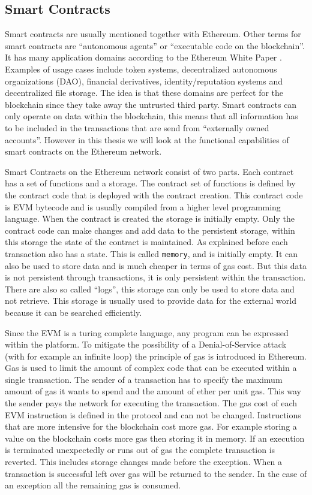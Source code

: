 \documentclass[a4paper]{article}
\begin{document}
\subsection{Smart Contracts}
Smart contracts are usually mentioned together with Ethereum. Other terms for smart contracts are ``autonomous agents'' or ``executable code on the blockchain''. It has many application domains according to the Ethereum White Paper \cite{buterin2013ethereum}. Examples of usage cases include token systems, decentralized autonomous organizations (DAO), financial derivatives, identity/reputation systems and decentralized file storage. The idea is that these domains are perfect for the blockchain since they take away the untrusted third party. Smart contracts can only operate on data within the blockchain, this means that all information has to be included in the transactions that are send from ``externally owned accounts''. However in this thesis we will look at the functional capabilities of smart contracts on the Ethereum network. \par 
Smart Contracts on the Ethereum network consist of two parts. Each contract has a set of functions and a storage. The contract set of functions is defined by the contract code that is deployed with the contract creation. This contract code is EVM bytecode and is usually compiled from a higher level programming language. When the contract is created the storage is initially empty. Only the contract code can make changes and add data to the persistent storage, within this storage the state of the contract is maintained. As explained before each transaction also has a state. This is called \texttt{memory}, and is initially empty. It can also be used to store data and is much cheaper in terms of gas cost. But this data is not persistent through transactions, it is only persistent within the transaction. There are also so called ``logs'', this storage can only be used to store data and not retrieve. This storage is usually used to provide data for the external world because it can be searched efficiently.\par
Since the EVM is a turing complete language, any program can be expressed within the platform. To mitigate the possibility of a Denial-of-Service attack (with for example an infinite loop) the principle of gas is introduced in Ethereum. Gas is used to limit the amount of complex code that can be executed within a single transaction. The sender of a transaction has to specify the maximum amount of gas it wants to spend and the amount of ether per unit gas. This way the sender pays the network for executing the transaction. The gas cost of each EVM instruction is defined in the protocol and can not be changed. Instructions that are more intensive for the blockchain cost more gas. For example storing a value on the blockchain costs more gas then storing it in memory. If an execution is terminated unexpectedly or runs out of gas the complete transaction is reverted. This includes storage changes made before the exception. When a transaction is successful left over gas will be returned to the sender. In the case of an exception all the remaining gas is consumed.
\end{document}
